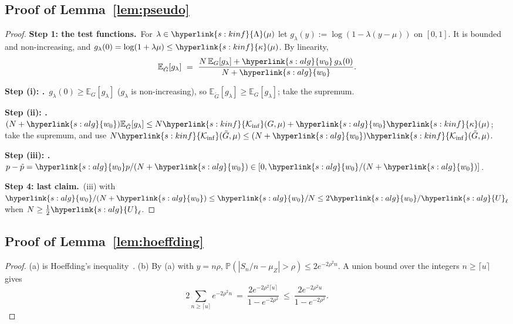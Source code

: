 \documentclass[10pt]{article}
\newcommand{\sy}[2]{{\hyperlink{#1}{#2}}}
\newcommand{\E}{\mathbb{E}}
\newcommand{\PP}{\mathbb{P}}
\newcommand{\1}{\mathbf{1}}
\newcommand{\Ki}{\sy{s:kinf}{\mathcal K_{\inf}}}
\newcommand{\kap}{\sy{s:kinf}{\kappa}}
\newcommand{\Lset}[1]{\sy{s:kinf}{\Lambda}(#1)}
\newcommand{\wz}{\sy{s:alg}{w_0}}
\newcommand{\Ug}{\sy{s:alg}{U}}
\newcommand{\stp}[2]{\par\medskip\noindent\textbf{Step #1: #2.}\ }
\begin{document}
\subsection{Proof of Lemma~\ref{lem:pseudo}}\label{sec:pf-lem:pseudo}
\begin{proof}
\stp1{the test functions}For $\lambda\in\Lset{\mu}$ let $g_\lambda(y):=\log(1-\lambda(y-\mu))$ on $[0,1]$. It is bounded and non-increasing, and $g_\lambda(0)=\log(1+\lambda\mu)\le\kap(\mu)$. By
linearity,
\[
\E_{\tilde G}[g_\lambda]\ =\ \frac{N\,\E_G[g_\lambda]+\wz\,g_\lambda(0)}{N+\wz}.
\]
\stp{(i)}{}$g_\lambda(0)\ge\E_G[g_\lambda]$ ($g_\lambda$ is non-increasing), so $\E_{\tilde G}[g_\lambda]\ge\E_G[g_\lambda]$; take the supremum.

\stp{(ii)}{}$(N+\wz)\E_{\tilde G}[g_\lambda]\le N\Ki(G,\mu)+\wz\kap(\mu)$; take the supremum, and use $N\Ki(\tilde G,\mu)\le(N+\wz)\Ki(\tilde G,\mu)$.

\stp{(iii)}{}$p-\tilde p=\wz p/(N+\wz)\in[0,\wz/(N+\wz)]$.

\stp4{last claim}(iii) with $\wz/(N+\wz)\le\wz/N\le2\wz/\Ug_\ell$ when $N\ge\frac12\Ug_\ell$.
\end{proof}

\subsection{Proof of Lemma~\ref{lem:hoeffding}}\label{sec:pf-lem:hoeffding}
\begin{proof}
(a) is Hoeffding's inequality~\citep{H63}. (b) By (a) with $y=n\rho$, $\PP(|S_n/n-\mu_Z|>\rho)\le2e^{-2\rho^2n}$. A union bound over the integers $n\ge\lceil u\rceil$ gives
\[
2\sum_{n\ge\lceil u\rceil}e^{-2\rho^2n}\ =\ \frac{2e^{-2\rho^2\lceil u\rceil}}{1-e^{-2\rho^2}}\ \le\ \frac{2e^{-2\rho^2u}}{1-e^{-2\rho^2}} .
\]
\end{proof}
\end{document}
